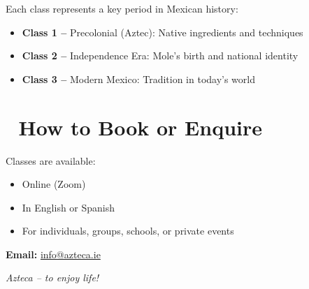\documentclass[12pt]{article}
\begin{document}
Each class represents a key period in Mexican history:
\begin{itemize}
\item \textbf{Class 1 –} Precolonial (Aztec): Native ingredients and techniques
\item \textbf{Class 2 –} Independence Era: Mole’s birth and national identity
\item \textbf{Class 3 –} Modern Mexico: Tradition in today’s world
\end{itemize}

\vspace{1em}
\section*{🎉 How to Book or Enquire}

Classes are available:
\begin{itemize}
\item Online (Zoom)
\item In English or Spanish
\item For individuals, groups, schools, or private events
\end{itemize}

\textbf{Email:} \href{mailto:info@azteca.ie}{info@azteca.ie}

\vfill
\begin{center}
\textit{Azteca – to enjoy life!}
\end{center}
\end{document}
